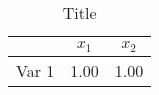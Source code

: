 \documentclass[12pt]{article}
\begin{document}
\begin{table}
\caption{Title}
\bigskip
\centering{}%
\begin{tabular}{ccc}\hline 
& $x_1$ & $x_2$\tabularnewline\hline 
Var 1 & 1.00 & 1.00 \tabularnewline\hline
\end{tabular}
\end{table}
\end{document}
